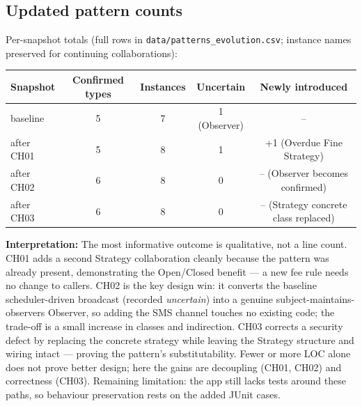 \documentclass[11pt,a4paper]{article}
\begin{document}
\subsection{Updated pattern counts}
Per-snapshot totals (full rows in \texttt{data/patterns\_evolution.csv}; instance names preserved for continuing collaborations):\par
\begin{tabularx}{\linewidth}{@{}Xcccc@{}}\toprule
Snapshot & Confirmed types & Instances & Uncertain & Newly introduced\\\midrule
baseline & 5 & 7 & 1 (Observer) & --\\
after CH01 & 5 & 8 & 1 & +1 (Overdue Fine Strategy)\\
after CH02 & 6 & 8 & 0 & -- (Observer becomes confirmed)\\
after CH03 & 6 & 8 & 0 & -- (Strategy concrete class replaced)\\\bottomrule
\end{tabularx}
\textbf{Interpretation:} The most informative outcome is qualitative, not a line count. CH01 adds a second Strategy collaboration cleanly because the pattern was already present, demonstrating the Open/Closed benefit --- a new fee rule needs no change to callers. CH02 is the key design win: it converts the baseline scheduler-driven broadcast (recorded \emph{uncertain}) into a genuine subject-maintains-observers Observer, so adding the SMS channel touches no existing code; the trade-off is a small increase in classes and indirection. CH03 corrects a security defect by replacing the concrete strategy while leaving the Strategy structure and wiring intact --- proving the pattern's substitutability. Fewer or more LOC alone does not prove better design; here the gains are decoupling (CH01, CH02) and correctness (CH03). Remaining limitation: the app still lacks tests around these paths, so behaviour preservation rests on the added JUnit cases.\par
\end{document}
